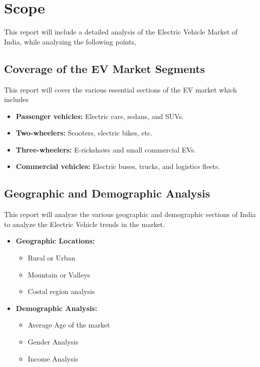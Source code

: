 \documentclass[a4paper,12pt]{report}
\begin{document}
\section{Scope}
This report will include a detailed analysis of the Electric Vehicle Market of India, while analyzing the following points,

\subsection{Coverage of the EV Market Segments}
This report will cover the various essential sections of the EV market which includes
\begin{itemize}
    \item \textbf{Passenger vehicles:} Electric cars, sedans, and SUVs.
    \item \textbf{Two-wheelers:} Scooters, electric bikes, etc.
    \item \textbf{Three-wheelers:} E-rickshaws and small commercial EVs.
    \item \textbf{Commercial vehicles:} Electric buses, trucks, and logistics fleets. 
\end{itemize}




\subsection{Geographic and Demographic Analysis}
This report will analyze the various geographic and demographic sections of India to analyze the Electric Vehicle trends in the market.
\begin{itemize}
    \item \textbf{Geographic Locations:}
    \begin{itemize}
        \item Rural or Urban 
        \item Mountain or Valleys
        \item Costal region analysis 
    \end{itemize}
    \item \textbf{Demographic Analysis:}
    \begin{itemize}
        \item Average Age of the market 
        \item Gender Analysis
        \item Income Analysis 
    \end{itemize}
\end{itemize}
\end{document}
